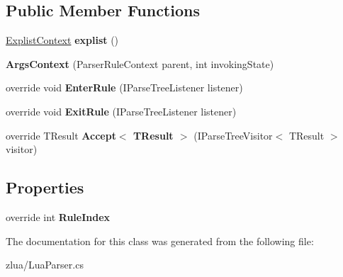 \subsection*{Public Member Functions}
\begin{DoxyCompactItemize}
\item 
\mbox{\label{classzlua_1_1_lua_parser_1_1_args_context_a9444177baf06bf0ae3bf2921a1530a3e}} 
\mbox{\hyperlink{classzlua_1_1_lua_parser_1_1_explist_context}{Explist\+Context}} {\bfseries explist} ()
\item 
\mbox{\label{classzlua_1_1_lua_parser_1_1_args_context_acef19eec19b8b531ca47d4df5d9d3d66}} 
{\bfseries Args\+Context} (Parser\+Rule\+Context parent, int invoking\+State)
\item 
\mbox{\label{classzlua_1_1_lua_parser_1_1_args_context_a6fe1916273abfa1d0232f74dacb2cc54}} 
override void {\bfseries Enter\+Rule} (I\+Parse\+Tree\+Listener listener)
\item 
\mbox{\label{classzlua_1_1_lua_parser_1_1_args_context_a5d78b09eb2714e395ea448e7f3b0db24}} 
override void {\bfseries Exit\+Rule} (I\+Parse\+Tree\+Listener listener)
\item 
\mbox{\label{classzlua_1_1_lua_parser_1_1_args_context_a41d43bd48fb04706781513e19ef6d79e}} 
override T\+Result {\bfseries Accept$<$ T\+Result $>$} (I\+Parse\+Tree\+Visitor$<$ T\+Result $>$ visitor)
\end{DoxyCompactItemize}
\subsection*{Properties}
\begin{DoxyCompactItemize}
\item 
\mbox{\label{classzlua_1_1_lua_parser_1_1_args_context_a924a5f204e8b67d385a2bef5956b4e54}} 
override int {\bfseries Rule\+Index}
\end{DoxyCompactItemize}


The documentation for this class was generated from the following file\+:\begin{DoxyCompactItemize}
\item 
zlua/Lua\+Parser.\+cs\end{DoxyCompactItemize}
